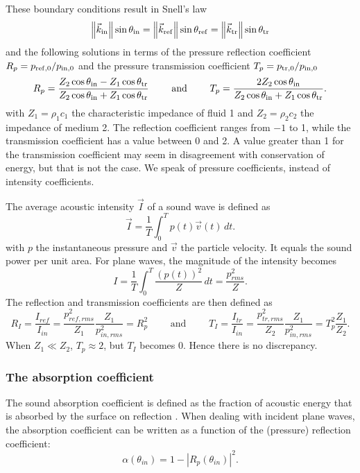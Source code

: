 These boundary conditions result in Snell's law
\[
\left\|\vec{k}_\mathrm{in}\right\| \sin\theta_\mathrm{in} = \left\|\vec{k}_\mathrm{ref}\right\| \sin\theta_\mathrm{ref} = \left\|\vec{k}_\mathrm{tr}\right\| \sin\theta_\mathrm{tr}
\]
and the following solutions in terms of the pressure reflection coefficient $R_p = p_\mathrm{ref, 0}/p_\mathrm{in, 0}$ and the pressure transmission coefficient $T_p = p_\mathrm{tr, 0}/p_\mathrm{in, 0}$ 
\[
R_p = \frac{Z_2 \cos \theta_\mathrm{in} - Z_1 \cos \theta_\mathrm{tr}}{Z_2 \cos \theta_\mathrm{in} + Z_1 \cos \theta_\mathrm{tr}} \qquad \textrm{ and } \qquad
T_p = \frac{2 Z_2 \cos \theta_\mathrm{in} }{Z_2 \cos \theta_\mathrm{in} + Z_1 \cos \theta_\mathrm{tr}}.
\]
with $Z_1 = \rho_1 c_1$ the characteristic impedance of fluid 1 and $Z_2 = \rho_2 c_2$ the impedance of medium 2.  
The reflection coefficient ranges from $-1$ to 1, while the transmission coefficient has a value between 0 and 2. A value greater than 1 for the transmission coefficient may seem in disagreement with conservation of energy, but that is not the case. We speak of pressure coefficients, instead of intensity coefficients. 

The average acoustic intensity $\vec{I}$ of a sound wave is defined as 
\[
\vec{I} = \frac{1}{T} \int^{T}_{0}{p(t) \vec{v}(t) \,dt}.
\]
with $p$ the instantaneous pressure and $\vec{v}$ the particle velocity. It equals the sound power per unit area. For plane waves, the magnitude of the intensity becomes 
\[
I = \frac{1}{T} \int^{T}_{0}{\frac{\left(p(t)\right)^2}{Z} \,dt} = \frac{p^2_{rms}}{Z}.
\]
The reflection and transmission coefficients are then defined as
\[
R_I = \frac{I_{ref}}{I_{in}} = \frac{p^2_{ref,rms}}{Z_1} \frac{Z_1}{p^2_{in,rms}} = R_p^2 \qquad\textrm{ and } \qquad T_I = \frac{I_{tr}}{I_{in}} = \frac{p^2_{tr,rms}}{Z_2} \frac{Z_1}{p^2_{in,rms}} = T_p^2 \frac{Z_1}{Z_2}. 
\]
When $Z_1 \ll Z_2$, $T_p \approx 2$, but $T_I$ becomes 0. Hence there is no discrepancy.




\subsubsection*{The absorption coefficient}
The sound absorption coefficient is defined as the fraction of acoustic energy that is absorbed by the surface on reflection \cite[p.12]{Geetere}.  When dealing with incident plane waves, the absorption coefficient can be written as a function of the (pressure) reflection coefficient:
\begin{equation}
\alpha(\theta_{in}) = 1 - \left|R_p(\theta_{in})\right|^2.
\label{absorption}
\end{equation}











\begin{comment}

\end{comment}

